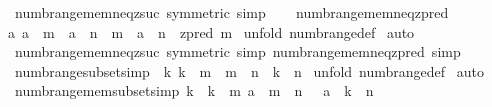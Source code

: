 \begin{isabellebody}
\ numb{\isacharunderscore}range{\isacharunderscore}mem{\isacharunderscore}neq{\isacharunderscore}zsuc\ {\isacharbrackleft}symmetric{\isacharcomma}\ simp{\isacharbrackright}\ \isanewline
\ \isanewline
\isanewline
{}\isamarkupfalse%
\ numb{\isacharunderscore}range{\isacharunderscore}mem{\isacharunderscore}neq{\isacharunderscore}zpred{\isacharcolon}\ \isanewline
{\isachardoublequoteopen}{\isacharbang}{\isacharbang}a{\isachardot}\ a\ {\isachartilde}{\isacharequal}\ m\ {\isacharequal}{\isacharequal}{\isachargreater}\ {\isacharparenleft}a\ {\isacharcolon}\ {\isacharparenleft}n\ {\isachardot}{\isachardot}\ m{\isacharparenright}{\isacharparenright}\ {\isacharequal}\ {\isacharparenleft}a\ {\isacharcolon}\ {\isacharparenleft}n\ {\isachardot}{\isachardot}\ zpred\ m{\isacharparenright}{\isacharparenright}{\isachardoublequoteclose}\isanewline
%
\isadelimproof
%
\endisadelimproof
%
\isatagproof
{}\isamarkupfalse%
\ {\isacharparenleft}unfold\ numb{\isacharunderscore}range{\isacharunderscore}def{\isacharparenright}\isanewline
{}\isamarkupfalse%
\ auto\isanewline
{}\isamarkupfalse%
%
\endisatagproof
{\isafoldproof}%
%
\isadelimproof
\isanewline
%
\endisadelimproof
{}\isamarkupfalse%
\ numb{\isacharunderscore}range{\isacharunderscore}mem{\isacharunderscore}neq{\isacharunderscore}zsuc\ {\isacharbrackleft}symmetric{\isacharcomma}\ simp{\isacharbrackright}\ numb{\isacharunderscore}range{\isacharunderscore}mem{\isacharunderscore}neq{\isacharunderscore}zpred\ {\isacharbrackleft}simp{\isacharbrackright}\isanewline
\isanewline
\isanewline
{}\isamarkupfalse%
\ numb{\isacharunderscore}range{\isacharunderscore}subset{\isacharbrackleft}simp{\isacharbrackright}{\isacharcolon}\ \ {\isachardoublequoteopen}{\isacharbang}{\isacharbang}k{\isachardot}\ k\ {\isacharless}{\isacharequal}\ m\ {\isacharequal}{\isacharequal}{\isachargreater}\ {\isacharparenleft}m\ {\isachardot}{\isachardot}\ n{\isacharparenright}\ {\isacharless}{\isacharequal}\ {\isacharparenleft}k\ {\isachardot}{\isachardot}\ n{\isacharparenright}{\isachardoublequoteclose}\isanewline
%
\isadelimproof
%
\endisadelimproof
%
\isatagproof
{}\isamarkupfalse%
\ {\isacharparenleft}unfold\ numb{\isacharunderscore}range{\isacharunderscore}def{\isacharparenright}\isanewline
{}\isamarkupfalse%
\ auto\isanewline
{}\isamarkupfalse%
%
\endisatagproof
{\isafoldproof}%
%
\isadelimproof
\isanewline
%
\endisadelimproof
\isanewline
\isanewline
{}\isamarkupfalse%
\ numb{\isacharunderscore}range{\isacharunderscore}mem{\isacharunderscore}subset{\isacharbrackleft}simp{\isacharbrackright}{\isacharcolon}\ {\isachardoublequoteopen}{\isacharbang}{\isacharbang}k{\isachardot}\ {\isacharbrackleft}{\isacharbar}\ k\ {\isacharless}\ m\ {\isacharsemicolon}a\ {\isacharcolon}\ {\isacharparenleft}m\ {\isachardot}{\isachardot}\ n{\isacharparenright}\ {\isacharbar}{\isacharbrackright}\ {\isacharequal}{\isacharequal}{\isachargreater}\ {\isacharparenleft}a\ {\isacharcolon}\ {\isacharparenleft}k\ {\isachardot}{\isachardot}\ n{\isacharparenright}{\isacharparenright}{\isachardoublequoteclose}\isanewline

\end{isabellebody}
